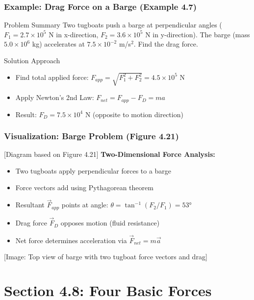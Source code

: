 \documentclass{beamer}
\begin{document}
\begin{frame}
\frametitle{Example: Drag Force on a Barge (Example 4.7)}
\begin{block}{Problem Summary}
Two tugboats push a barge at perpendicular angles ($F_1 = 2.7 \times 10^5$ N in x-direction, $F_2 = 3.6 \times 10^5$ N in y-direction). The barge (mass $5.0 \times 10^6$ kg) accelerates at $7.5 \times 10^{-2}$ m/s$^2$. Find the drag force.
\end{block}
\pause
\begin{alertblock}{Solution Approach}
\begin{itemize}
    \item Find total applied force: $F_{app} = \sqrt{F_1^2 + F_2^2} = 4.5 \times 10^5$ N
    \item Apply Newton's 2nd Law: $F_{net} = F_{app} - F_D = ma$
    \item Result: $F_D = 7.5 \times 10^4$ N (opposite to motion direction)
\end{itemize}
\end{alertblock}
\end{frame}

\begin{frame}
\frametitle{Visualization: Barge Problem (Figure 4.21)}
\begin{alertblock}{[Diagram based on Figure 4.21]}
\textbf{Two-Dimensional Force Analysis:}
\begin{itemize}
    \item Two tugboats apply perpendicular forces to a barge
    \item Force vectors add using Pythagorean theorem
    \item Resultant $\vec{F}_{app}$ points at angle: $\theta = \tan^{-1}(F_2/F_1) = 53°$
    \item Drag force $\vec{F}_D$ opposes motion (fluid resistance)
    \item Net force determines acceleration via $\vec{F}_{net} = m\vec{a}$
\end{itemize}
\alert{[Image: Top view of barge with two tugboat force vectors and drag]}
\end{alertblock}
\end{frame}

\section{Section 4.8: Four Basic Forces}
\end{document}
